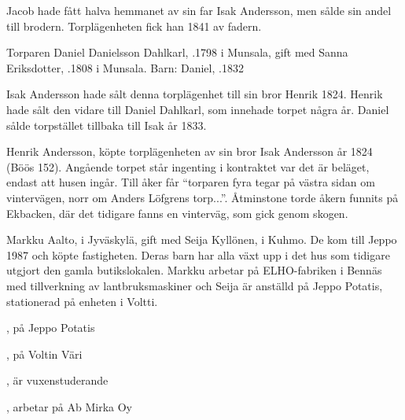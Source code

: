 Jacob hade fått halva hemmanet av sin far Isak Andersson, men sålde sin andel till brodern. Torplägenheten fick han 1841 av fadern.


Torparen Daniel Danielsson Dahlkarl, .1798 i Munsala, gift med Sanna Eriksdotter, .1808 i Munsala.
Barn:	Daniel, .1832

Isak Andersson hade sålt denna torplägenhet till sin bror Henrik 1824. Henrik hade sålt den vidare till Daniel Dahlkarl, som innehade torpet några år. Daniel sålde torpstället tillbaka till Isak år 1833.


Henrik Andersson, köpte torplägenheten av sin bror Isak Andersson år 1824 (Böös 152). Angående torpet står ingenting i kontraktet var det är beläget, endast att husen ingår. Till åker får ``torparen fyra tegar på västra sidan om vintervägen, norr om Anders Löfgrens torp...''. Åtminstone torde åkern funnits på Ekbacken, där det tidigare fanns en 	vinterväg, som gick genom skogen.






Markku Aalto,  i Jyväskylä, gift med Seija Kyllönen,  i Kuhmo. De kom till Jeppo 1987 och köpte fastigheten. Deras barn har alla växt upp i det hus som tidigare utgjort den gamla butikslokalen. Markku arbetar på ELHO-fabriken i Bennäs med tillverkning av lantbruksmaskiner och Seija är anställd på Jeppo Potatis, stationerad på enheten i Voltti.
\begin{jhchildren}
  \item {}
  \item {}, på Jeppo Potatis
  \item {}, på Voltin Väri
  \item {}, är vuxenstuderande
  \item {}, arbetar på Ab Mirka Oy
\end{jhchildren}


